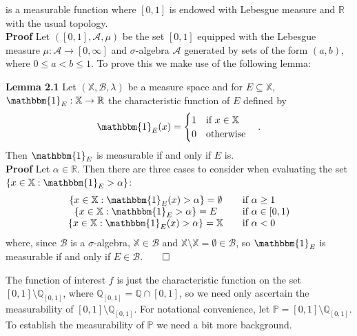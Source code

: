 \documentclass[11pt, letterpaper]{article}
\newcommand{\mbb}[1]{\mathbb{#1}}
\newcommand{\bbm}[1]{\mathbbm{#1}}
\newcommand{\mc}[1]{\mathcal{#1}}
\begin{document}
    is a measurable function where $[0,1]$ is endowed with Lebesgue measure and $\mbb{R}$ with the usual topology.\\[10pt]
    {\bf Proof} Let $([0,1],\mc{A},\mu)$ be the set $[0,1]$ equipped with the Lebesgue measure $\mu:\mc{A}\rightarrow[0,\infty]$ and $\sigma$-algebra $\mc{A}$ generated by sets of the form $(a,b)$, where $0\leq a<b\leq 1$.
    To prove this we make use of the following lemma:
    \begin{center}
        \begin{minipage}[c]{0.85\linewidth}
            {\bf Lemma 2.1} Let $(\mbb{X},\mc{B},\lambda)$ be a measure space and for $E\subseteq \mbb{X}$, $\mathbbm{1}_E:\mbb{X}\rightarrow\mbb{R}$ the characteristic function of $E$ defined by
            \[\mathbbm{1}_E(x)=\begin{cases}
                1\quad\text{if $x\in \mbb{X}$}\\
                0\quad\text{otherwise}
            \end{cases}.\]
            Then $\mathbbm{1}_E$ is measurable if and only if $E$ is.\\[10pt]
            {\bf Proof} Let $\alpha\in\mbb{R}$. Then there are three cases to consider when evaluating the set $\{x\in \mbb{X}:\mathbbm{1}_E>\alpha\}$:
            \begin{align*}
                \begin{array}{cl}
                    \{x\in\mbb{X}:\bbm{1}_E(x)>\alpha\}=\emptyset& \quad\text{if $\alpha\geq 1$}\\
                    \{x\in\mbb{X}:\bbm{1}_E>\alpha\}=E&\quad\text{if $\alpha\in[0,1)$}\\
                    \{x\in\mbb{X}:\bbm{1}_E(x)>\alpha\}=\mbb{X}&\quad\text{if $\alpha<0$}
                \end{array}
            \end{align*}
            where, since $\mc{B}$ is a $\sigma$-algebra, $\mbb{X}\in\mc{B}$ and $\mbb{X}\setminus\mbb{X}=\emptyset\in\mc{B}$, so $\bbm{1}_E$ is measurable if and only if $E\in\mc{B}$.\hfill{$\qed$}
        \end{minipage}
    \end{center}\vspace{10pt}
    The function of interest $f$ is just the characteristic function on the set $[0,1]\setminus\mbb{Q}_{[0,1]}$, where $\mbb{Q}_{[0,1]}=\mbb{Q}\cap[0,1]$, so we need only ascertain
    the measurability of $[0,1]\setminus\mbb{Q}_{[0,1]}$. For notational convenience, let $\mbb{P}=[0,1]\setminus\mbb{Q}_{[0,1]}$. To establish the measurability of $\mbb{P}$ we need a bit more background.\\[10pt]
\end{document}
